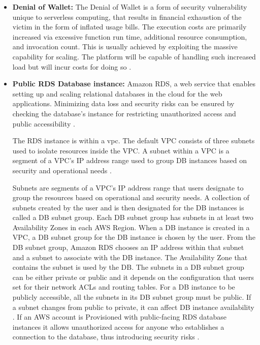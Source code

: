 \begin{itemize}
    \item \textbf{Denial of Wallet:} The Denial of Wallet is a form of security vulnerability unique to serverless
    computing,
    that results in financial exhaustion of the victim in the form of inflated usage bills.
    The execution costs are
    primarily increased via excessive function run time, additional resource consumption, and invocation count.
    This
    is usually achieved by exploiting the massive capability for scaling.
    The platform will be capable of handling
    such increased load but will incur costs for doing so
    \cite{63} \cite{64} \cite{65}.
\end{itemize}

\begin{itemize}
    \item \textbf{Public RDS Database instance:} Amazon RDS, a web service that enables setting up and scaling
    relational databases in the cloud for the web applications.
    Minimizing data loss and security risks can be
    ensured by checking the database’s instance for
    restricting unauthorized access and public
    accessibility \cite{66}.

    The RDS instance is within a \gls{vpc}.
    The default VPC consists of three subnets used to 
    isolate resources inside the VPC. A subnet within a 
    VPC is a segment of a VPC's IP address range used to 
    group DB instances based on security and operational 
    needs \cite{67}.

    Subnets are segments of a VPC's IP address range that users designate to group the resources based on operational and security needs.
    A collection of subnets created by the user and is then designated for the DB instances is called a DB subnet group.
    Each DB subnet group has subnets in at least two
    Availability Zones in each AWS Region.
    When a DB instance is created in a VPC, a DB subnet group for the DB instance is chosen by the user.
    From the DB subnet group, Amazon RDS chooses an IP address within that subnet and a subnet to associate with the DB instance.
    The Availability Zone that contains the subnet is
    used by the DB. The subnets in a DB subnet group can
    be either private or public and it depends on the
    configuration that users set for their network ACLs
    and routing tables. For a DB instance to be publicly accessible, all the subnets in its DB subnet group must be public. If a subnet changes from public to private, it can affect DB instance availability \cite{67}. If an AWS account is Provisioned with public-facing RDS database instances it allows unauthorized access for anyone who establishes a connection to the database, thus introducing security risks \cite{68}.
\end{itemize}

